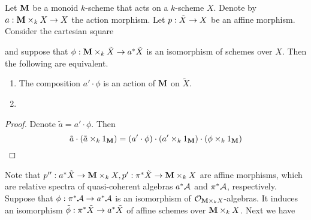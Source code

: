 \section{}

\begin{proposition}
Let $\mathbf{M}$ be a monoid $k$-scheme that acts on a $k$-scheme $X$. Denote by $a:\mathbf{M}\times_kX\rightarrow X$ the action morphism. Let $p:\tilde{X}\rightarrow X$ be an affine morphism. Consider the cartesian square
\begin{center}
\end{center}
and suppose that $\phi:\mathbf{M}\times_k\tilde{X}\rightarrow a^*\tilde{X}$ is an isomorphism of schemes over $X$. Then the following are equivalent.
\begin{enumerate}[label=\emph{\textbf{(\arabic*)}}, leftmargin=3.0em]
\item The composition $a' \cdot \phi$ is an action of $\mathbf{M}$ on $\tilde{X}$.
\item 
\end{enumerate}
\end{proposition}
\begin{proof}
Denote $\tilde{a} = a'\cdot \phi$. Then
$$\tilde{a}\cdot \left(\tilde{a}\times_k1_{\mathbf{M}}\right) = \left(a'\cdot \phi\right)\cdot \left(a'\times_k1_{\mathbf{M}}\right) \cdot \left(\phi\times_k 1_{\mathbf{M}}\right)$$
\end{proof}
Note that $p'':a^*\tilde{X}\rightarrow \mathbf{M}\times_k X,p':\pi^*\tilde{X}\rightarrow \mathbf{M}\times_kX$ are affine morphisms, which are relative spectra of quasi-coherent algebras $a^*{\mathcal A}$ and $\pi^*{\mathcal A}$, respectively. Suppose that $\phi:\pi^*{\mathcal A}\rightarrow a^*{\mathcal A}$ is an isomorphism of ${\mathcal O}_{\mathbf{M}\times_kX}$-algebras. It induces an isomorphism $\tilde{\phi}:\pi^*\tilde{X}\rightarrow a^*\tilde{X}$ of affine schemes over $\mathbf{M}\times_kX$. Next we have





\small




